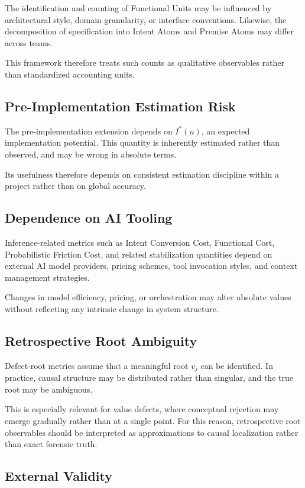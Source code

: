\documentclass[twocolumn]{aastex701}
\begin{document}
The identification and counting of Functional Units may be influenced
by architectural style, domain granularity, or interface conventions.
Likewise, the decomposition of specification into Intent Atoms and Premise Atoms
may differ across teams.

This framework therefore treats such counts as qualitative observables
rather than standardized accounting units.

\subsection{Pre-Implementation Estimation Risk}

The pre-implementation extension depends on $I^\ast(u)$,
an expected implementation potential.
This quantity is inherently estimated rather than observed,
and may be wrong in absolute terms.

Its usefulness therefore depends on consistent estimation discipline
within a project rather than on global accuracy.

\subsection{Dependence on AI Tooling}

Inference-related metrics such as Intent Conversion Cost, Functional Cost,
Probabilistic Friction Cost, and related stabilization quantities
depend on external AI model providers, pricing schemes,
tool invocation styles, and context management strategies.

Changes in model efficiency, pricing, or orchestration may alter
absolute values without reflecting any intrinsic change in system structure.

\subsection{Retrospective Root Ambiguity}

Defect-root metrics assume that a meaningful root $v_j$ can be identified.
In practice, causal structure may be distributed rather than singular,
and the true root may be ambiguous.

This is especially relevant for value defects,
where conceptual rejection may emerge gradually rather than at a single point.
For this reason, retrospective root observables should be interpreted
as approximations to causal localization rather than exact forensic truth.

\subsection{External Validity}
\end{document}
